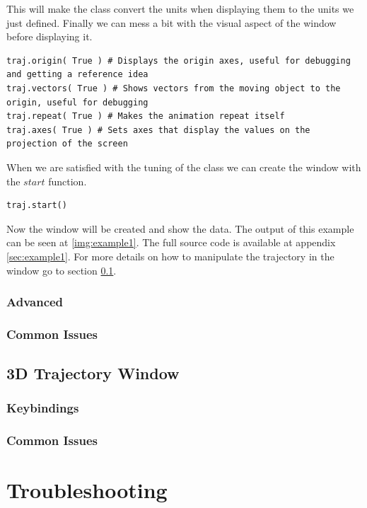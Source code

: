 \documentclass[a4paper,11pt]{article}
\begin{document}
This will make the class convert the units when displaying them to the units we just defined. Finally we can mess a bit with the visual aspect of the window before displaying it.

\begin{verbatim}
traj.origin( True ) # Displays the origin axes, useful for debugging and getting a reference idea
traj.vectors( True ) # Shows vectors from the moving object to the origin, useful for debugging
traj.repeat( True ) # Makes the animation repeat itself
traj.axes( True ) # Sets axes that display the values on the projection of the screen
\end{verbatim}

When we are satisfied with the tuning of the class we can create the window with the $start$ function.

\begin{verbatim}
traj.start()
\end{verbatim}

Now the window will be created and show the data. The output of this example can be seen at \ref{img:example1}. The full source code is available at appendix \ref{sec:example1}. For more details on how to manipulate the trajectory in the window go to section \ref{sec:window}.


\subsubsection{Advanced}\label{sec:advanced}


\subsubsection{Common Issues}


\subsection{3D Trajectory Window}\label{sec:window}


\subsubsection{Keybindings}


\subsubsection{Common Issues}


\section{Troubleshooting}\label{sec:troubleshoot}
\end{document}
